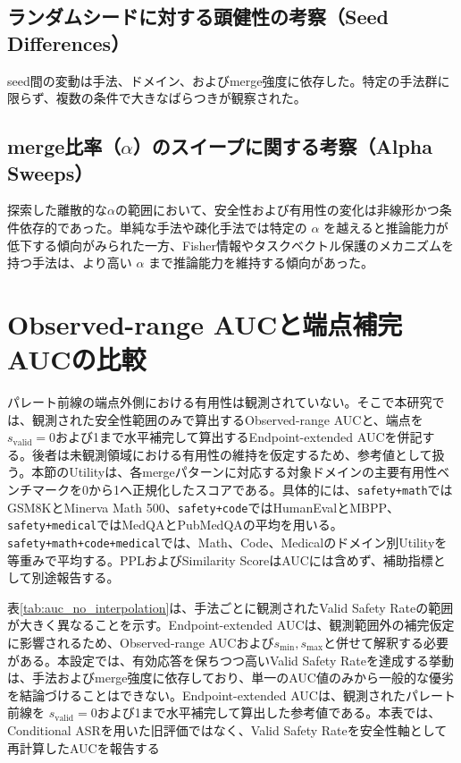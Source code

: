 \documentclass{article}
\begin{document}
\subsection{ランダムシードに対する頭健性の考察（Seed Differences）}
seed間の変動は手法、ドメイン、およびmerge強度に依存した。特定の手法群に限らず、複数の条件で大きなばらつきが観察された。

\subsection{merge比率（$\alpha$）のスイープに関する考察（Alpha Sweeps）}
探索した離散的な\(\alpha\)の範囲において、安全性および有用性の変化は非線形かつ条件依存的であった。単純な手法や疎化手法では特定の $\alpha$ を越えると推論能力が低下する傾向がみられた一方、Fisher情報やタスクベクトル保護のメカニズムを持つ手法は、より高い $\alpha$ まで推論能力を維持する傾向があった。

\section{Observed-range AUCと端点補完AUCの比較}
\label{app:observed_range_auc}
パレート前線の端点外側における有用性は観測されていない。そこで本研究では、観測された安全性範囲のみで算出するObserved-range AUCと、端点を\(s_{\mathrm{valid}}=0\)および1まで水平補完して算出するEndpoint-extended AUCを併記する。後者は未観測領域における有用性の維持を仮定するため、参考値として扱う。本節のUtilityは、各mergeパターンに対応する対象ドメインの主要有用性ベンチマークを0から1へ正規化したスコアである。具体的には、\texttt{safety+math}ではGSM8KとMinerva Math 500、\texttt{safety+code}ではHumanEvalとMBPP、\texttt{safety+medical}ではMedQAとPubMedQAの平均を用いる。\texttt{safety+math+code+medical}では、Math、Code、Medicalのドメイン別Utilityを等重みで平均する。PPLおよびSimilarity ScoreはAUCには含めず、補助指標として別途報告する。

表\ref{tab:auc_no_interpolation}は、手法ごとに観測されたValid Safety Rateの範囲が大きく異なることを示す。Endpoint-extended AUCは、観測範囲外の補完仮定に影響されるため、Observed-range AUCおよび\(s_{\min}, s_{\max}\)と併せて解釈する必要がある。本設定では、有効応答を保ちつつ高いValid Safety Rateを達成する挙動は、手法およびmerge強度に依存しており、単一のAUC値のみから一般的な優劣を結論づけることはできない。Endpoint-extended AUCは、観測されたパレート前線を \(s_{\mathrm{valid}}=0\)および1まで水平補完して算出した参考値である。本表では、Conditional ASRを用いた旧評価ではなく、Valid Safety Rateを安全性軸として再計算したAUCを報告する
\end{document}
